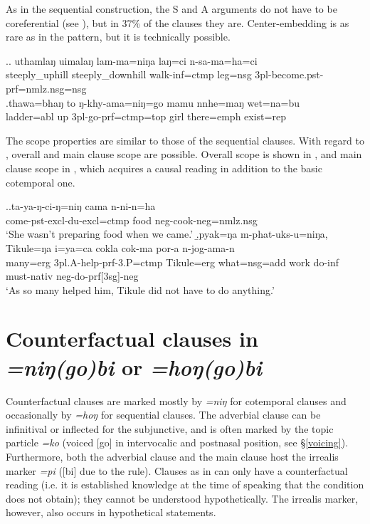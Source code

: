 As in the sequential construction, the S and A arguments do not have to be coreferential (see \Next), but in 37\% of the clauses they are. Center-embedding is as rare as in the  pattern, but it is technically possible.

 \ex.\ag. uthamlaŋ uimalaŋ lam-ma=niŋa laŋ=ci n-sa-ma=ha=ci\\
		steeply\_uphill steeply\_downhill walk{\sc -inf=ctmp} leg{\sc =nsg} {\sc 3pl-}become{\sc .pst-prf=nmlz.nsg=nsg}\\ 
	\bg.thawa=bhaŋ    to  ŋ-khy-ama=niŋ=go                    mamu nnhe=maŋ    wet=na=bu\\
ladder{\sc =abl} up {\sc 3pl-}go{\sc -prf=ctmp=top} girl there{\sc =emph} exist{\sc [3sg]=rep}\\
 


The scope properties are similar to those of the sequential clauses. With regard  to , overall and main clause scope are possible. Overall scope is shown in \Next[a], and main clause scope in \Next[b], which acquires a causal reading in addition to the basic cotemporal one. 

\ex.\ag.ta-ya-ŋ-ci-ŋ=niŋ cama n-ni-n=ha\\
		come{\sc -pst-excl-du-excl=ctmp} food {\sc neg-}cook{\sc [pst;3.P]-neg=nmlz.nsg}\\
		‘She wasn’t preparing food when we came.’
	\b.\label{ex-tikule-do}\gll	pyak=ŋa m-phat-uks-u=niŋa, Tikule=ŋa   i=ya=ca cokla cok-ma    por-a n-jog-ama-n\\
		many={\sc erg} {\sc 3pl.A-}help{\sc -prf-3.P=ctmp} Tikule={\sc erg} what{\sc =nsg=add} work  do{\sc -inf} must{\sc -nativ} {\sc neg-}do{\sc -prf[3sg]-neg}\\
		‘As so many helped him, Tikule did not have to do anything.’ 



\section{Counterfactual clauses in \emph{=niŋ(go)bi} or  \emph{=hoŋ(go)bi} }\label{adv-cl-count}

Counterfactual clauses are marked mostly by \emph{=niŋ} for cotemporal clauses and occasionally by \emph{=hoŋ} for sequential clauses. The adverbial clause can be infinitival or inflected for the subjunctive, and is often marked by the topic particle \emph{=ko} (voiced [go]  in intervocalic and postnasal position, see §\ref{voicing}). Furthermore, both the adverbial clause and the main clause host the irrealis marker \emph{=pi} ([bi] due to the  rule). Clauses as in \Next can only have a counterfactual reading (i.e. it is established knowledge at the time of speaking that the condition does not obtain); they cannot be understood hypothetically. The irrealis marker, however, also occurs in hypothetical statements.



